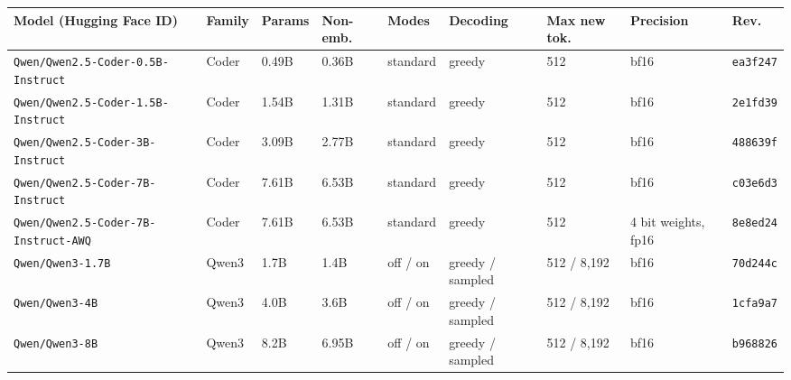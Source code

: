 \begin{tabular}{@{}llllllll l@{}}
\toprule
Model (Hugging Face ID) & Family & Params & Non-emb. & Modes & Decoding & Max new tok. & Precision & Rev. \\
\midrule
\texttt{Qwen/Qwen2.5-Coder-0.5B-Instruct} & Coder & 0.49B & 0.36B & standard & greedy & 512 & bf16 & \texttt{ea3f247} \\
\texttt{Qwen/Qwen2.5-Coder-1.5B-Instruct} & Coder & 1.54B & 1.31B & standard & greedy & 512 & bf16 & \texttt{2e1fd39} \\
\texttt{Qwen/Qwen2.5-Coder-3B-Instruct} & Coder & 3.09B & 2.77B & standard & greedy & 512 & bf16 & \texttt{488639f} \\
\texttt{Qwen/Qwen2.5-Coder-7B-Instruct} & Coder & 7.61B & 6.53B & standard & greedy & 512 & bf16 & \texttt{c03e6d3} \\
\texttt{Qwen/Qwen2.5-Coder-7B-Instruct-AWQ} & Coder & 7.61B & 6.53B & standard & greedy & 512 & 4 bit weights, fp16 & \texttt{8e8ed24} \\
\midrule
\texttt{Qwen/Qwen3-1.7B} & Qwen3 & 1.7B & 1.4B & off / on & greedy / sampled & 512 / 8,192 & bf16 & \texttt{70d244c} \\
\texttt{Qwen/Qwen3-4B} & Qwen3 & 4.0B & 3.6B & off / on & greedy / sampled & 512 / 8,192 & bf16 & \texttt{1cfa9a7} \\
\texttt{Qwen/Qwen3-8B} & Qwen3 & 8.2B & 6.95B & off / on & greedy / sampled & 512 / 8,192 & bf16 & \texttt{b968826} \\
\bottomrule
\end{tabular}

